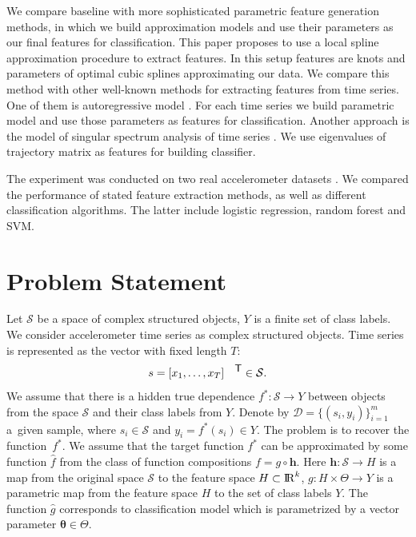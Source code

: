 \documentclass{llncs}
\newcommand{\T}{{\mbox{\footnotesize\sffamily\upshape\mdseries T}}}
\begin{document}
We compare baseline with more sophisticated parametric feature generation methods, in which we build approximation models and use their parameters as our final features for classification. 
This paper proposes to use a local spline approximation procedure to extract features.
In this setup features are knots and parameters of optimal cubic splines approximating our data. 
We compare this method with other well-known methods for extracting features from time series.
One of them is autoregressive model \cite{lukashin2003adaptive}. 
For each time series we build parametric model and use those parameters as features for classification. 
Another approach is the model of singular spectrum analysis of time series \cite{hassani2007singular}. 
We use eigenvalues of trajectory matrix as features for building classifier. 

The experiment was conducted on two real accelerometer datasets \cite{wisdm,usc}. 
We compared the performance of stated feature extraction methods, as well as different classification algorithms. 
The latter include logistic regression, random forest and SVM.


\section{Problem Statement}
Let $\mathcal{S}$ be a space of complex structured objects, $Y$ is a finite set of class labels. 
We consider accelerometer time series as complex structured objects. Time series is represented as the vector with fixed length $T$:
\begin{equation}
s = [x_1, \dots, x_T]^{\T} \in \mathcal{S}.
\label{eq::time_series}
\end{equation}
We assume that there is a hidden true dependence $f^*: \mathcal{S} \rightarrow Y$ between objects from the space $\mathcal{S}$ and their class labels from $Y$.
Denote by $\mathcal{D} = \{(s_i, y_i)\}_{i=1}^m$ a~given sample, where $s_i \in \mathcal{S}$ and $y_i = f^*(s_i)\in Y$.
The problem is to recover the function~$f^*$. 
We assume that the target function $f^*$ can be approximated by some function $\hat{f}$ from the class of function compositions $f = g \circ \bm{h}$. 
Here $\bm{h}: \mathcal{S} \rightarrow H$ is a map from the original space $\mathcal{S}$ to the feature space $H \subset {\rm I\!R}^k$,
$g: H \times \Theta \rightarrow Y$ is a parametric map from the feature space $H$ to the set of class labels $Y$. 
The function $\hat{g}$ corresponds to classification model which is parametrized by a vector parameter $\boldsymbol{\theta} \in \Theta$. 
\end{document}
